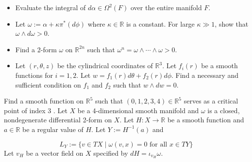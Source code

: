 \documentclass[14pt]{extarticle}
\begin{document}
\begin{itemize}
  \item Evaluate the integral of $d \alpha \in \Omega^{2}(F)$ over the entire manifold $F$.

  \item Let $\omega:=\alpha+\kappa \pi^{*}(d \phi)$ where $\kappa \in \mathbb{R}$ is a constant. For large $\kappa \gg 1$, show that $\omega \wedge d \omega>0$.

\end{itemize}
\newpage

\begin{itemize}
  \item Find a 2-form $\omega$ on $\mathbb{R}^{2 n}$ such that $\omega^{n}=\omega \wedge \cdots \wedge \omega>0$.
  \item Let $(r, \theta, z)$ be the cylindrical coordinates of $\mathbb{R}^{3}$. Let $f_{i}(r)$ be a smooth functions for $i=1,2$. Let $w=f_{1}(r) d \theta+f_{2}(r) d \phi$. Find a necessary and sufficient condition on $f_{1}$ and $f_{2}$ such that $w \wedge d w=0$.
\end{itemize}
\newpage
Find a smooth function on $\mathbb{R}^{5}$ such that $(0,1,2,3,4) \in \mathbb{R}^{5}$ serves as a critical point of index 3 .
\newpage
Let $X$ be a 4-dimensional smooth manifold and $\omega$ is a closed, nondegenerate differential 2-form on $X$. Let $H: X \rightarrow \mathbb{R}$ be a smooth function and $a \in \mathbb{R}$ be a regular value of $H$. Let $Y:=H^{-1}(a)$ and

$$
L_{Y}:=\{v \in T X \mid \omega(v, x)=0 \text { for all } x \in T Y\}
$$
Let $v_{H}$ be a vector field on $X$ specified by $d H=\iota_{v_{H}} \omega$.
\end{document}
